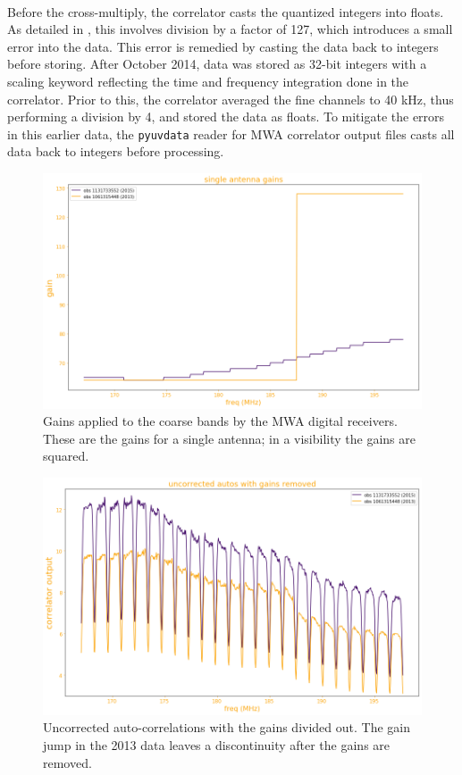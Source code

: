 \documentclass[11pt]{article}
\begin{document}
\paragraph{}Before the cross-multiply, the correlator casts the quantized integers into floats. As detailed in \cite{beardsley}, this involves division by a factor of 127, which introduces a small error into the data. This error is remedied by casting the data back to integers before storing. After October 2014, data was stored as 32-bit integers with a scaling keyword reflecting the time and frequency integration done in the correlator. Prior to this, the correlator averaged the fine channels to 40 kHz, thus performing a division by 4, and stored the data as floats. To mitigate the errors in this earlier data, the \texttt{pyuvdata} reader for MWA correlator output files casts all data back to integers before processing.
\begin{figure}
\centering{}
\includegraphics[width=135mm]{gains.png}
\caption{Gains applied to the coarse bands by the MWA digital receivers. These are the gains for a single antenna; in a visibility the gains are squared.\label{gains}}
\end{figure}
\begin{figure}
\centering{}
\includegraphics[width=140mm]{uncorr_autos_gains.png}
\caption{Uncorrected auto-correlations with the gains divided out. The gain jump in the 2013 data leaves a discontinuity after the gains are removed.\label{uncorr_autos_gains}}
\end{figure}
\end{document}
